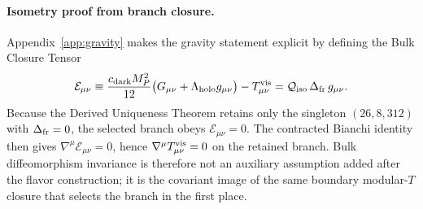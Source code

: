 \documentclass[11pt]{article}
\begin{document}
\paragraph{Isometry proof from branch closure.}
Appendix~\ref{app:gravity} makes the gravity statement explicit by defining the Bulk Closure Tensor
\begin{equation}
 \mathcal E_{\mu\nu}
 \equiv
 \frac{c_{\rm dark}M_P^2}{12}\bigl(G_{\mu\nu}+\Lambda_{\rm holo}g_{\mu\nu}\bigr)-T^{\rm vis}_{\mu\nu}
 =
 \mathcal Q_{\rm iso}\,\Delta_{\rm fr}\,g_{\mu\nu}.
\end{equation}
Because the Derived Uniqueness Theorem retains only the singleton $(26,8,312)$ with $\Delta_{\rm fr}=0$, the selected branch obeys $\mathcal E_{\mu\nu}=0$. The contracted Bianchi identity then gives $\nabla^{\mu}\mathcal E_{\mu\nu}=0$, hence $\nabla^{\mu}T^{\rm vis}_{\mu\nu}=0$ on the retained branch. Bulk diffeomorphism invariance is therefore not an auxiliary assumption added after the flavor construction; it is the covariant image of the same boundary modular-$T$ closure that selects the branch in the first place.
\end{document}

